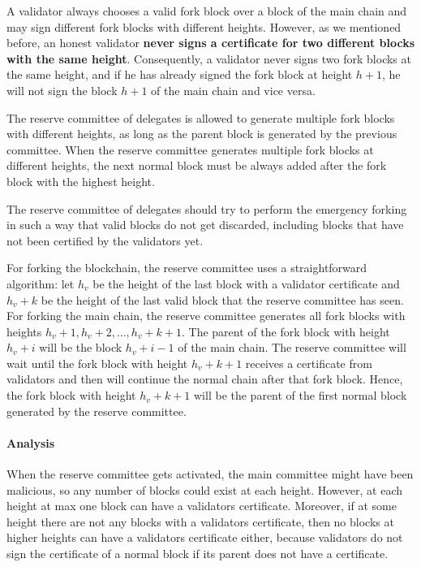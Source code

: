 A validator always chooses a valid fork block over a block of the main chain and may sign different fork
blocks with different heights. However, as we mentioned before, an honest validator
\textbf{never signs a certificate for two different blocks with the same height}. Consequently, a validator never
signs two fork blocks at the same height, and if he has already signed the fork block at height $h+1$, he will not
sign the block $h+1$ of the main chain and vice versa.

The reserve committee of delegates is allowed to generate multiple fork blocks with different heights, as long as the
parent block is generated by the previous committee. When the reserve committee generates multiple fork blocks
at different heights, the next normal block must be always added after the fork block with the highest height.

The reserve committee of delegates should try to perform the emergency forking in such a way that
valid blocks do not get discarded, including blocks that have not been certified by the validators yet.

For forking the blockchain, the reserve committee uses a straightforward algorithm: let $h_v$ be the height of the last
block with a validator certificate and $h_v+k$ be the height of the last valid block that the reserve committee has
seen. For forking the main chain, the reserve committee generates all fork blocks with heights $h_v+1,h_v+2,\dots,
h_v+k+1$. The parent of the fork block with height $h_v+i$ will be the block $h_v+i-1$ of the main chain. The
reserve committee will wait until the fork block with height $h_v+k+1$ receives a certificate from validators and
then will continue the normal chain after that fork block. Hence, the fork block with height $h_v+k+1$
will be the parent of the first normal block generated by the reserve committee.

\paragraph{Analysis}

When the reserve committee gets activated, the main committee might have been malicious, so any number of blocks could
exist at each height. However, at each height at max one block can have a validators certificate. Moreover, if at some
height there are not any blocks with a validators certificate, then no blocks at higher heights can have a
validators certificate either, because validators do not sign the certificate of a normal block if its parent does
not have a certificate.

